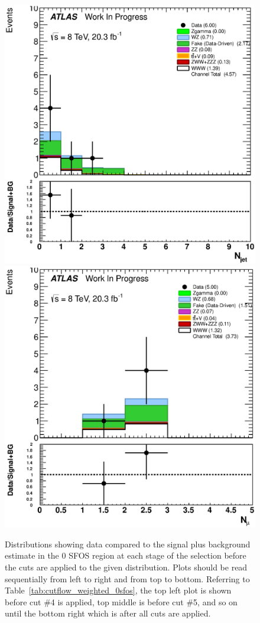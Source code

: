 \begin{figure}[ht!]
\includegraphics[width=0.3\columnwidth]{figures/appendix_signal_selection/PreselectionJune2_NoSTVF_0SFOS_ChargeAbs1_BVeto85_SFMllGt20_SSMeeZVeto15_DeltaPhi2p5_physics/weight_all/eps/NJets_histratio.eps}
\includegraphics[width=0.3\columnwidth]{figures/appendix_signal_selection/PreselectionJune2_NoSTVF_0SFOS_ChargeAbs1_BVeto85_SFMllGt20_SSMeeZVeto15_DeltaPhi2p5_NJetLt2_physics/weight_all/eps/NMuons_histratio.eps}
\caption{Distributions showing data compared to the signal plus background estimate in the 0 SFOS region at each stage 
of the selection before the cuts are applied to the given distribution. 
Plots should be read sequentially from left to right
and from top to bottom. 
Referring to Table~\ref{tab:cutflow_weighted_0sfos}, the top left
plot is shown before cut \#4 is applied, top middle is before cut \#5, and
so on until the bottom right which is after all cuts are applied.
}
\label{fig:0sfos}
\end{figure}

%


\clearpage
